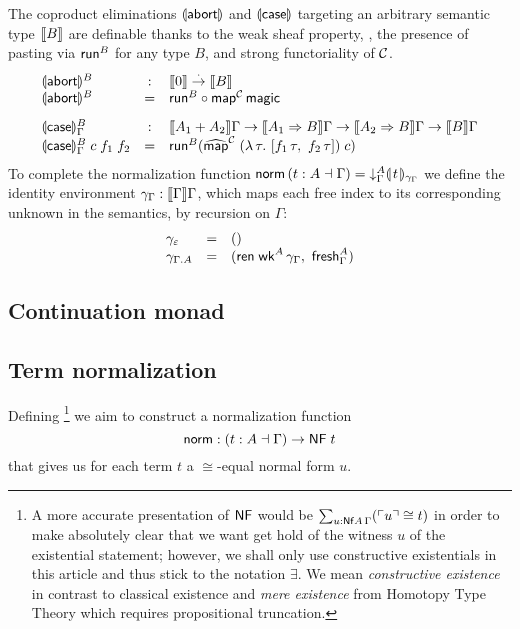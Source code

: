 \documentclass[a4paper,USenglish,cleveref, autoref]{lipics-v2019}
\begin{document}
The coproduct eliminations $\denabort$ and $\dencase$
targeting an arbitrary semantic type $\den B$ are definable thanks to
the weak sheaf property, \ie, the presence of pasting via $\trun^B$
for any type $B$, and strong functoriality of $\C$.
\[
\begin{array}{lcl}
  \denabort^B & : & \den \tyzero \todot \den B \\
  \denabort^B & = & \trun^B \comp \tmap[\C]\,\tmagic
\\[2ex]
  \dencase^B_\Gamma  & : & \den{A_1 + A_2}\Gamma
    \to \den{A_1 \To B}\Gamma
    \to \den{A_2 \To B}\Gamma
    \to \den{B}\Gamma \\
  \dencase^B_\Gamma\;c\;f_1\;f_2 & = &
    \trun^B (\stmap[\C]\;(\lambda\,\tau.\ [f_1\,\tau,\ f_2\,\tau])\;c) \\
\end{array}
\]
To complete the normalization function
$\tnorm\,(t : A \from \Gamma) = \downG A \dent t {\idenv \Gamma}$
we define the identity environment $\idenv \Gamma : \den \Gamma \Gamma$,
which maps each free index to its corresponding unknown in the
semantics, by recursion on $\Gamma$:
\[
\begin{array}{lcl}
  \idenv \cempty & = & \ttempty \\
  \idenv {\cext \Gamma A} & = & (\tren\;\twk^A\,\idenv\Gamma, \  \tfresh^A_\Gamma)\\
\end{array}
\]

\subsection{Continuation monad}



\clearpage

\subsection{Term normalization}

Defining%
\footnote{%
A more accurate presentation of $\tNF$ would be
$\sum_{u : \tNf A\,\Gamma} (\tm u \cong t)$
in order to make absolutely clear that we
want get hold of the witness $u$ of the existential statement;
however, we shall only use constructive
existentials
in this article and thus stick to the notation $\exists$.
We mean \emph{constructive existence} in
  contrast to classical existence and
  \emph{mere existence} from Homotopy Type Theory which
  requires propositional truncation.
}
we aim to construct a normalization function
\[
  \tnorm : (t : A \from \Gamma) \to \NF t
\]
that gives us for each term $t$ a $\cong$-equal normal form $u$.
\end{document}
